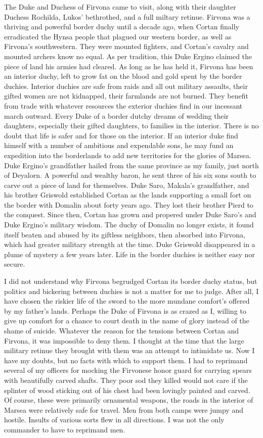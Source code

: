 \documentclass{article}
\begin{document}
The Duke and Duchess of Firvona came to visit, along with their daughter Duchess Rochilda, Lukos' bethrothed, and a full miltary retinue. Firvona was a thriving and powerful border duchy until a decade ago, when Cortan finally erradicated the Hynsa people that plagued our western border, as well as Firvona's southwestern. They were mounted fighters, and Cortan's cavalry and mounted archers know no equal. As per tradition, this Duke Ergino claimed the piece of land his armies had cleared. As long as he has held it, Firvona has been an interior duchy, left to grow fat on the blood and gold spent by the border duchies. Interior duchies are safe from raids and all out military assaults, their gifted women are not kidnapped, their farmlands are not burned. They benefit from trade with whatever resources the exterior duchies find in our incessant march outward. Every Duke of a border dutchy dreams of wedding their daughters, especially their gifted daughters, to families in the interior. There is no doubt that life is safer and for those on the interior. If an interior duke find himself with a number of ambitious and expendable sons, he may fund an expedition into the borderlands to add new territories for the glories of Marsea. Duke Ergino's grandfather hailed from the same province as my family, just north of Deyalorn. A powerful and wealthy baron, he sent three of his six sons south to carve out a piece of land for themselves. Duke Saro, Makala's grandfather, and his brother Griswold established Cortan as the lands supporting a small fort on the border with Domalin about forty years ago. They lost their brother Pierd to the conquest. Since then, Cortan has grown and propered under Duke Saro's and Duke Ergino's military wisdom. The duchy of Domalin no longer exists, it found itself beaten and abused by its giftless neighbors, then absorbed into Firvona, which had greater military strength at the time. Duke Griswold disappeared in a plume of mystery a few years later. Life in the border duchies is neither easy nor secure. 

I did not understand why Firvona begrudged Cortan its border duchy status, but politics and bickering between duchies is not a matter for me to judge. After all, I have chosen the riskier life of the sword to the more mundane comfort's offered by my father's lands. Perhaps the Duke of Firvona is as crazed as I, willing to give up comfort for a chance to court death in the name of glory instead of the shame of suicide. Whatever the reason for the tensions between Cortan and Firvona, it was impossible to deny them. I thought at the time that the large military retinue they brought with them was an attempt to intimidate us. Now I have my doubts, but no facts with which to support them. I had to reprimand several of my officers for mocking the Firvonese honor guard for carrying spears with beautifully carved shafts. They poor sod they killed would not care if the splinter of wood sticking out of his chest had been lovingly painted and carved. Of course, these were primarily ornamental weapons, the roads in the interior of Marsea were relatively safe for travel. Men from both camps were jumpy and hostile. Insults of various sorts flew in all directions. I was not the only commander to have to reprimand men. 
\end{document}
